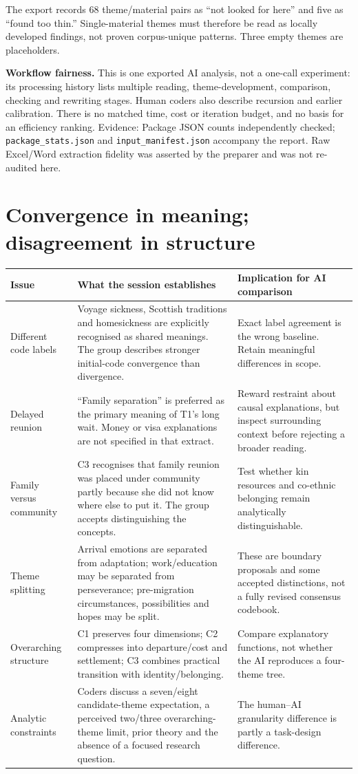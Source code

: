 \documentclass[10pt,a4paper]{article}
\newcommand{\kicker}[1]{{\sffamily\small\bfseries\color{teal}#1}\par\vspace{5pt}}
\newcommand{\source}[1]{{\footnotesize\color{muted}Evidence: #1}\par}
\newcommand{\page}[2]{\clearpage\kicker{#1}\section*{#2}}
\begin{document}
The export records 68 theme/material pairs as ``not looked for here'' and five as ``found too thin.'' Single-material themes must therefore be read as locally developed findings, not proven corpus-unique patterns. Three empty themes are placeholders.

\textbf{Workflow fairness.} This is one exported AI analysis, not a one-call experiment: its processing history lists multiple reading, theme-development, comparison, checking and rewriting stages. Human coders also describe recursion and earlier calibration. There is no matched time, cost or iteration budget, and no basis for an efficiency ranking.
\source{Package JSON counts independently checked; \texttt{package\_stats.json} and \texttt{input\_manifest.json} accompany the report. Raw Excel/Word extraction fidelity was asserted by the preparer and was not re-audited here.}

\page{03 / WHAT ADJUDICATION DISCOVERED}{Convergence in meaning; disagreement in structure}
\begin{tabularx}{\linewidth}{@{}p{3.3cm}Yp{3.9cm}@{}}
\toprule
\textbf{Issue} & \textbf{What the session establishes} & \textbf{Implication for AI comparison}\tabularnewline\midrule
Different code labels & Voyage sickness, Scottish traditions and homesickness are explicitly recognised as shared meanings. The group describes stronger initial-code convergence than divergence. & Exact label agreement is the wrong baseline. Retain meaningful differences in scope.\tabularnewline
Delayed reunion & ``Family separation'' is preferred as the primary meaning of T1's long wait. Money or visa explanations are not specified in that extract. & Reward restraint about causal explanations, but inspect surrounding context before rejecting a broader reading.\tabularnewline
Family versus community & C3 recognises that family reunion was placed under community partly because she did not know where else to put it. The group accepts distinguishing the concepts. & Test whether kin resources and co-ethnic belonging remain analytically distinguishable.\tabularnewline
Theme splitting & Arrival emotions are separated from adaptation; work/education may be separated from perseverance; pre-migration circumstances, possibilities and hopes may be split. & These are boundary proposals and some accepted distinctions, not a fully revised consensus codebook.\tabularnewline
Overarching structure & C1 preserves four dimensions; C2 compresses into departure/cost and settlement; C3 combines practical transition with identity/belonging. & Compare explanatory functions, not whether the AI reproduces a four-theme tree.\tabularnewline
Analytic constraints & Coders discuss a seven/eight candidate-theme expectation, a perceived two/three overarching-theme limit, prior theory and the absence of a focused research question. & The human--AI granularity difference is partly a task-design difference.\tabularnewline\bottomrule
\end{tabularx}
\end{document}
